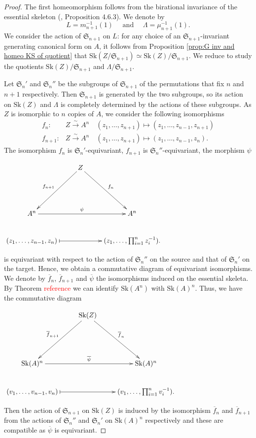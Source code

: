 \documentclass{amsart}%
\numberwithin{equation}{subsection}
\theoremstyle{plain2}
\theoremstyle{definition2}
\theoremstyle{stepstyle}
\theoremstyle{point}
\theoremstyle{subpoint}
\newcommand{\Sk}{\mathrm{Sk}}
\begin{document}
\begin{proof}
The first homeomorphism follows from the birational invariance of the essential skeleton (\cite{MustataNicaise}, Proposition 4.6.3). We denote by $$L=m_{n+1}^{-1}(1) \quad \text{ and }\quad \Lambda=\mu_{n+1}^{-1}(1).$$ We consider the action of $\mathfrak{S}_{n+1}$ on $L$: for any choice of an $\mathfrak{S}_{n+1}$-invariant generating canonical form on $A$, it follows from Proposition \ref{prop:G inv and homeo KS of quotient} that $\Sk(Z/\mathfrak{S}_{n+1}) \simeq \Sk(Z)/\mathfrak{S}_{n+1}$. We reduce to study the quotients $\Sk(Z)/\mathfrak{S}_{n+1}$ and $\Lambda/\mathfrak{S}_{n+1}$.

Let $\mathfrak{S}_n'$ and $\mathfrak{S}_n''$ be the subgroups of $\mathfrak{S}_{n+1}$ of the permutations that fix $n$ and $n+1$ respectively. Then $\mathfrak{S}_{n+1}$ is generated by the two subgroups, so its action on $\Sk(Z)$ and $\Lambda$ is completely determined by the actions of these subgroups. As $Z$ is isomorphic to $n$ copies of $A$, we consider the following isomorphisms 
\begin{align*}
f_n: &Z \xrightarrow{\sim} A^n \quad (z_1,\ldots,z_{n+1}) \mapsto (z_1,\ldots,z_{n-1},z_{n+1}) \\
f_{n+1}: &Z \xrightarrow{\sim} A^n \quad (z_1,\ldots,z_{n+1}) \mapsto (z_1,\ldots,z_{n-1},z_{n}).
\end{align*} The isomorphism $f_n$ is $\mathfrak{S}_n'$-equivariant, $f_{n+1}$ is $\mathfrak{S}_n''$-equivariant, the morphism $\psi$
\begin{center}
\xymatrixrowsep{0.1pc} $\xymatrix{
& Z  \ar[ldd]_{f_{n+1}} \ar[ddr]^{f_n} &\\
& & \\
A^n \ar[rr]^{\psi}& & A^n \\
(z_1,\ldots,z_{n-1},z_{n}) \ar@{|->}[rr]& & (z_1,\ldots, \prod_{i=1}^{n} z_i^{-1}).
}$
\end{center} is equivariant with respect to the action of $\mathfrak{S}_n''$ on the source and that of $\mathfrak{S}_n'$ on the target. Hence, we obtain a commutative diagram of equivariant isomorphisms. We denote by $\overline{f}_n$, $\overline{f}_{n+1}$ and $\overline{\psi}$ the isomorphisms induced on the essential skeleta. By Theorem \textcolor{red}{reference} we can identify $\Sk(A^n)$ with $\Sk(A)^n$. Thus, we have the commutative diagram
\begin{center}
\xymatrixrowsep{0.1pc} $\xymatrix{
& \Sk(Z)  \ar[ldd]_{\overline{f}_{n+1}} \ar[ddr]^{\overline{f}_n} &\\
& & \\
\Sk(A)^n \ar[rr]^{\overline{\psi}}& & \Sk(A)^n \\
(v_1,\ldots,v_{n-1},v_{n}) \ar@{|->}[rr]& & (v_1,\ldots, \prod_{i=1}^{n} v_i^{-1}).
}$
\end{center} Then the action of $\mathfrak{S}_{n+1}$ on $\Sk(Z)$ is induced by the isomorphism $\overline{f}_n$ and $\overline{f}_{n+1}$ from the actions of $\mathfrak{S}_n''$ and $\mathfrak{S}_n'$ on $\Sk(A)^n$ respectively and these are compatible as $\overline{\psi}$ is equivariant.


\end{proof}
\end{document}
